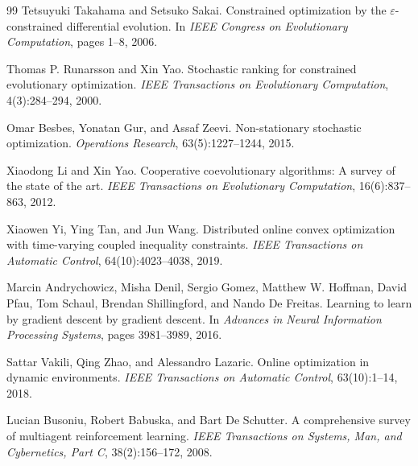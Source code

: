 \begin{titlepage}
\begin{thebibliography}{99}
Tetsuyuki Takahama and Setsuko Sakai.
Constrained optimization by the $\varepsilon$-constrained differential evolution.
In \emph{IEEE Congress on Evolutionary Computation}, pages 1--8, 2006.

Thomas P. Runarsson and Xin Yao.
Stochastic ranking for constrained evolutionary optimization.
\emph{IEEE Transactions on Evolutionary Computation}, 4(3):284--294, 2000.

Omar Besbes, Yonatan Gur, and Assaf Zeevi.
Non-stationary stochastic optimization.
\emph{Operations Research}, 63(5):1227--1244, 2015.

Xiaodong Li and Xin Yao.
Cooperative coevolutionary algorithms: A survey of the state of the art.
\emph{IEEE Transactions on Evolutionary Computation}, 16(6):837--863, 2012.

Xiaowen Yi, Ying Tan, and Jun Wang.
Distributed online convex optimization with time-varying coupled inequality constraints.
\emph{IEEE Transactions on Automatic Control}, 64(10):4023--4038, 2019.

Marcin Andrychowicz, Misha Denil, Sergio Gomez, Matthew W. Hoffman,
David Pfau, Tom Schaul, Brendan Shillingford, and Nando De Freitas.
Learning to learn by gradient descent by gradient descent.
In \emph{Advances in Neural Information Processing Systems},
pages 3981--3989, 2016.

Sattar Vakili, Qing Zhao, and Alessandro Lazaric.
Online optimization in dynamic environments.
\emph{IEEE Transactions on Automatic Control}, 63(10):1--14, 2018.

Lucian Busoniu, Robert Babuska, and Bart De Schutter.
A comprehensive survey of multiagent reinforcement learning.
\emph{IEEE Transactions on Systems, Man, and Cybernetics, Part C},
38(2):156--172, 2008.

\end{thebibliography}

\end{titlepage}